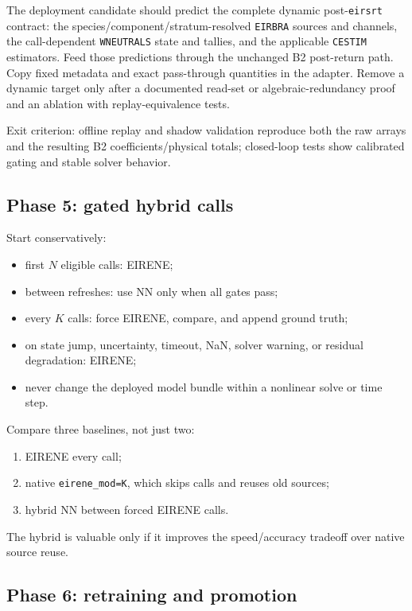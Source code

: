 \documentclass[11pt]{article}
\begin{document}
The deployment candidate should predict the complete dynamic post-\texttt{eirsrt} contract: the species/component/stratum-resolved \texttt{EIRBRA} sources and channels, the call-dependent \texttt{WNEUTRALS} state and tallies, and the applicable \texttt{CESTIM} estimators. Feed those predictions through the unchanged B2 post-return path. Copy fixed metadata and exact pass-through quantities in the adapter. Remove a dynamic target only after a documented read-set or algebraic-redundancy proof and an ablation with replay-equivalence tests.

Exit criterion: offline replay and shadow validation reproduce both the raw arrays and the resulting B2 coefficients/physical totals; closed-loop tests show calibrated gating and stable solver behavior.

\subsection{Phase 5: gated hybrid calls}

Start conservatively:

\begin{itemize}
\item first $N$ eligible calls: EIRENE;
\item between refreshes: use NN only when all gates pass;
\item every $K$ calls: force EIRENE, compare, and append ground truth;
\item on state jump, uncertainty, timeout, NaN, solver warning, or residual degradation: EIRENE;
\item never change the deployed model bundle within a nonlinear solve or time step.
\end{itemize}

Compare three baselines, not just two:

\begin{enumerate}
\item EIRENE every call;
\item native \texttt{eirene\_mod=K}, which skips calls and reuses old sources;
\item hybrid NN between forced EIRENE calls.
\end{enumerate}

The hybrid is valuable only if it improves the speed/accuracy tradeoff over native source reuse.

\subsection{Phase 6: retraining and promotion}
\end{document}

